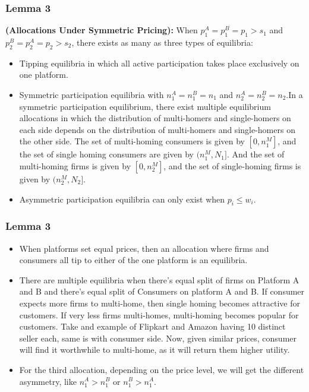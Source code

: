 \documentclass[11pt]{beamer}
\theoremstyle{boldstyle}
\begin{document}
\begin{frame}
	\frametitle{Lemma 3}
	\begin{small}
		\begin{lemma}
			\textbf{(Allocations Under Symmetric Pricing):} When $p_1^A=p_1^B=p_1>s_1$ and $p_2^B=p_2^A=p_2>s_2$, there exists as many as three types of equilibria:
			\begin{itemize}
				\item Tipping equilibria in which all active participation takes place exclusively on one platform.
				\item Symmetric participation equilibria with $n_1^A=n_1^B=n_1$ and $n_2^A=n_2^B=n_2$.In a symmetric participation equilibrium, there exist multiple equilibrium allocations in which the distribution of multi-homers and single-homers on each side depends on the distribution of multi-homers and single-homers on the other side. The set of multi-homing consumers is given by $[0,n_1^M]$, and the set of single homing consumers are given by $(n_1^M,N_1]$. And the set of multi-homing firms is given by $[0,n_2^M]$, and the set of single-homing firms is given by $(n_2^M,N_2]$.
				\item Asymmetric participation equilibria can only exist when $p_i \leq w_i$. 
			\end{itemize}
			
		\end{lemma}
	\end{small}
\end{frame}

\begin{frame}
	\frametitle{Lemma 3}
	\begin{small}
	\begin{itemize}
		\item When platforms set equal prices, then an allocation where firms and consumers all tip to either of the one platform is an equilibria.
		\item There are multiple equilibria when there's equal split of firms on Platform A and B and there's equal split of Consumers on platform A and B. If consumer expects more firms to multi-home, then single homing becomes attractive for customers. If very less firms multi-homes, multi-homing becomes popular for customers. 
		Take and example of Flipkart and Amazon having 10 distinct seller each, same is with consumer side. Now, given similar prices, consumer will find it worthwhile to multi-home, as it will return them higher utility. 
		\item For the third allocation, depending on the price level, we will get the different asymmetry, like $n_1^A>n_1^B$ or $n_1^B>n_1^A$.  
	\end{itemize}
	\end{small}
\end{frame}
\end{document}
